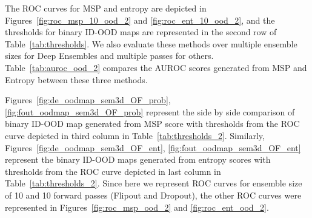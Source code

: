     The ROC curves for MSP and entropy are depicted in Figures~\ref{fig:roc_msp_10_ood_2} and \ref{fig:roc_ent_10_ood_2}, and the thresholds for binary ID-OOD maps are represented in the second row of Table~\ref{tab:thresholds}.
    We also evaluate these methods over multiple ensemble sizes for Deep Ensembles and multiple passes for others.
    Table~\ref{tab:auroc_ood_2} compares the AUROC scores generated from MSP and Entropy between these three methods.
    
    Figures~\ref{fig:de_oodmap_sem3d_OF_prob}, \ref{fig:fout_oodmap_sem3d_OF_prob} represent the side by side comparison of binary ID-OOD map generated from MSP score with thresholds from the ROC curve depicted in third column in Table~\ref{tab:thresholds_2}.
    Similarly, Figures~\ref{fig:de_oodmap_sem3d_OF_ent}, \ref{fig:fout_oodmap_sem3d_OF_ent} represent the binary ID-OOD maps generated from entropy scores with thresholds from the ROC curve depicted in last column in Table~\ref{tab:thresholds_2}.
    Since here we represent ROC curves for ensemble size of 10 and 10 forward passes (Flipout and Dropout), the other ROC curves were represented in Figures~\ref{fig:roc_msp_ood_2} and \ref{fig:roc_ent_ood_2}.

